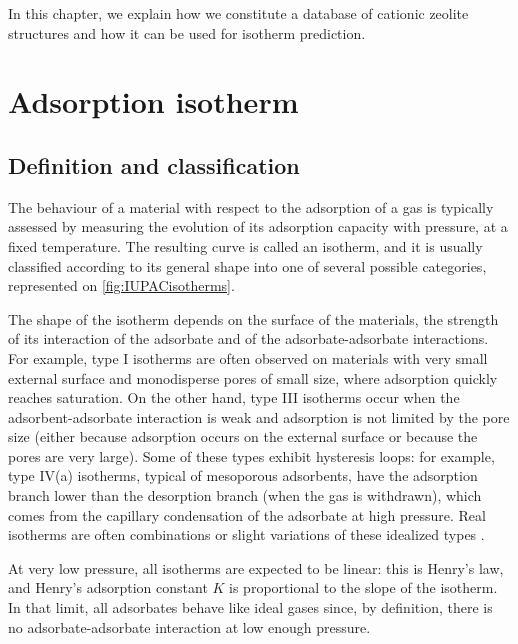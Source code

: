 \documentclass[main.tex]{subfiles}
\begin{document}
In this chapter, we explain how we constitute a database of cationic zeolite structures and how it can be used for isotherm prediction.

\section{Adsorption isotherm}

\subsection{Definition and classification}

The behaviour of a material with respect to the adsorption of a gas is typically assessed by measuring the evolution of its adsorption capacity with pressure, at a fixed temperature. The resulting curve is called an isotherm, and it is usually classified according to its general shape into one of several possible categories, represented on \cref{fig:IUPACisotherms}.

The shape of the isotherm depends on the surface of the materials, the strength of its interaction of the adsorbate and of the adsorbate-adsorbate interactions. For example, type I isotherms are often observed on materials with very small external surface and monodisperse pores of small size, where adsorption quickly reaches saturation. On the other hand, type III isotherms occur when the adsorbent-adsorbate interaction is weak and adsorption is not limited by the pore size (either because adsorption occurs on the external surface or because the pores are very large). Some of these types exhibit hysteresis loops: for example, type IV(a) isotherms, typical of mesoporous adsorbents, have the adsorption branch lower than the desorption branch (when the gas is withdrawn), which comes from the capillary condensation of the adsorbate at high pressure. Real isotherms are often combinations or slight variations of these idealized types \autocite{BrandaniIsotherms2016}.

At very low pressure, all isotherms are expected to be linear: this is Henry's law, and Henry's adsorption constant $K$ is proportional to the slope of the isotherm. In that limit, all adsorbates behave like ideal gases since, by definition, there is no adsorbate-adsorbate interaction at low enough pressure.
\end{document}
